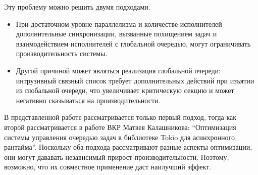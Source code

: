 Эту проблему можно решить двумя подходами.

\begin{itemize}
    \item При достаточном уровне параллелизма и количестве исполнителей дополнительные синхронизации, вызванные похищением задач и взаимодействием исполнителей с глобальной очередью, могут ограничивать производительность системы.
    \item Другой причиной может являться реализация глобальной очереди: интрузивный связный список требует дополнительных действий при изъятии из глобальной очереди, что увеличивает критическую секцию и может негативно сказываться на производительности.
\end{itemize}

В представленной работе рассматривается только первый подход, тогда как второй рассматривается в работе ВКР Матвея Калашникова: ``Оптимизация системы управления очередью задач в библиотеке Tokio для асинхронного рантайма''. Поскольку оба подхода рассматривают разные аспекты оптимизации, они могут дававать независимый прирост производительности. Поэтому, возможно, что их совместное применение даст наилучший эффект.
